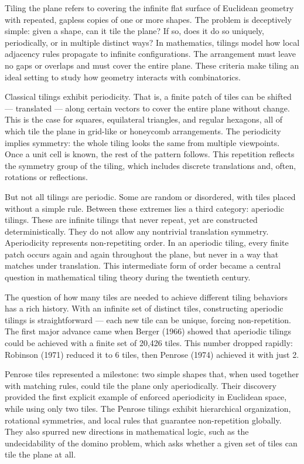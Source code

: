 Tiling the plane refers to covering the infinite flat surface of Euclidean geometry with repeated, gapless copies of one or more shapes. The problem is deceptively simple: given a shape, can it tile the plane? If so, does it do so uniquely, periodically, or in multiple distinct ways? In mathematics, tilings model how local adjacency rules propagate to infinite configurations. The arrangement must leave no gaps or overlaps and must cover the entire plane. These criteria make tiling an ideal setting to study how geometry interacts with combinatorics.

Classical tilings exhibit periodicity. That is, a finite patch of tiles can be shifted — translated — along certain vectors to cover the entire plane without change. This is the case for squares, equilateral triangles, and regular hexagons, all of which tile the plane in grid-like or honeycomb arrangements. The periodicity implies symmetry: the whole tiling looks the same from multiple viewpoints. Once a unit cell is known, the rest of the pattern follows. This repetition reflects the symmetry group of the tiling, which includes discrete translations and, often, rotations or reflections.

But not all tilings are periodic. Some are random or disordered, with tiles placed without a simple rule. Between these extremes lies a third category: aperiodic tilings. These are infinite tilings that never repeat, yet are constructed deterministically. They do not allow any nontrivial translation symmetry. Aperiodicity represents non-repetiting order. In an aperiodic tiling, every finite patch occurs again and again throughout the plane, but never in a way that matches under translation. This intermediate form of order became a central question in mathematical tiling theory during the twentieth century.

The question of how many tiles are needed to achieve different tiling behaviors has a rich history. With an infinite set of distinct tiles, constructing aperiodic tilings is straightforward — each new tile can be unique, forcing non-repetition. The first major advance came when Berger (1966) showed that aperiodic tilings could be achieved with a finite set of 20,426 tiles. This number dropped rapidly: Robinson (1971) reduced it to 6 tiles, then Penrose (1974) achieved it with just 2.

Penrose tiles represented a milestone: two simple shapes that, when used together with matching rules, could tile the plane only aperiodically. Their discovery provided the first explicit example of enforced aperiodicity in Euclidean space, while using only two tiles. The Penrose tilings exhibit hierarchical organization, rotational symmetries, and local rules that guarantee non-repetition globally. They also spurred new directions in mathematical logic, such as the undecidability of the domino problem, which asks whether a given set of tiles can tile the plane at all.

